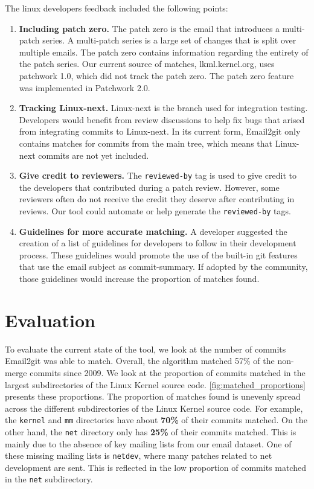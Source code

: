 The linux developers feedback included the following points:
\begin{enumerate}
	\item \textbf{Including patch zero.} The patch zero is the email that introduces a multi-patch series. A multi-patch series is a large set of changes that is split over multiple emails. The patch zero contains information regarding the entirety of the patch series. Our current source of matches, lkml.kernel.org, uses patchwork 1.0, which did not track the patch zero. The patch zero feature was implemented in Patchwork 2.0.

	\item \textbf{Tracking Linux-next.} Linux-next is the branch used for integration testing. Developers would benefit from review discussions to help fix bugs that arised from integrating commits to Linux-next. In its current form, Email2git only contains matches for commits from the main tree, which means that Linux-next commits are not yet included.

	\item \textbf{Give credit to reviewers.} The \texttt{reviewed-by} tag is used to give credit to the developers that contributed during a patch review. However, some reviewers often do not receive the credit they deserve after contributing in reviews. Our tool could automate or help generate the \texttt{reviewed-by} tags.

	\item \textbf{Guidelines for more accurate matching.} A developer suggested the creation of a list of guidelines for developers to follow in their development process. These guidelines would promote the use of the built-in git features that use the email subject as commit-summary. If adopted by the community, those guidelines would increase the proportion of matches found. 
\end{enumerate}


\section{Evaluation}

To evaluate the current state of the tool, we look at the number of commits Email2git was able to match. Overall, the algorithm matched 57\% of the non-merge commits since 2009. We look at the proportion of commits matched in the largest subdirectories of the Linux Kernel source code. \autoref{fig:matched_proportions} presents these proportions. The proportion of matches found is unevenly spread across the different subdirectories of the Linux Kernel source code. For example, the \texttt{kernel} and \texttt{mm} directories have about \textbf{70\%} of their commits matched. On the other hand, the \texttt{net} directory only has \textbf{25\%} of their commits matched. This is mainly due to the absence of key mailing lists from our email dataset. One of these missing mailing lists is \texttt{netdev}, where many patches related to net development are sent. This is reflected in the low proportion of commits matched in the \texttt{net} subdirectory. 


